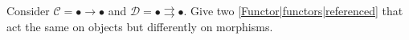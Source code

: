 
Consider $\mathcal{C}=\boxed{\bullet \rightarrow \bullet}$ and $\mathcal{D}=\boxed{\bullet \rightrightarrows \bullet}$. Give two \ref{Functor|functors|referenced} that act the same on objects but differently on morphisms.